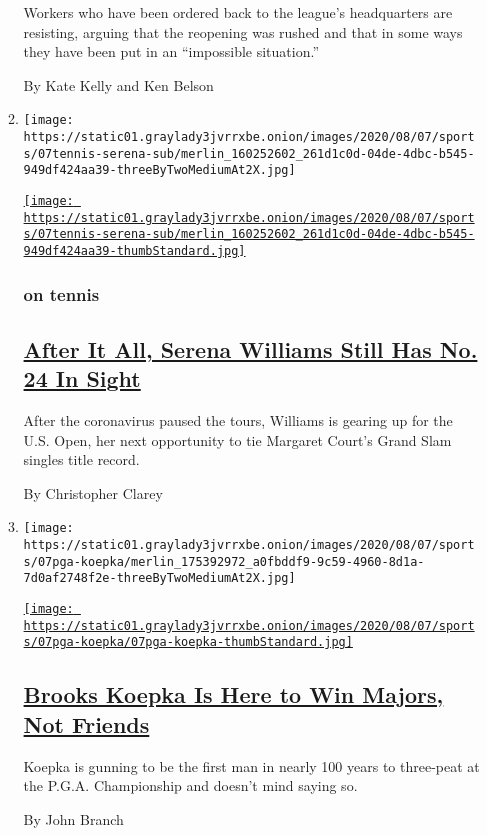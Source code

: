 \begin{enumerate}
\begin{enumerate}
    Workers who have been ordered back to the league's headquarters are
    resisting, arguing that the reopening was rushed and that in some
    ways they have been put in an ``impossible situation.''

    By Kate Kelly and Ken Belson
  \item
    \texttt{[image: https://static01.graylady3jvrrxbe.onion/images/2020/08/07/sports/07tennis-serena-sub/merlin\_160252602\_261d1c0d-04de-4dbc-b545-949df424aa39-threeByTwoMediumAt2X.jpg]}

    \href{/2020/08/07/sports/tennis/serena-williams-us-open.html}{\texttt{[image: https://static01.graylady3jvrrxbe.onion/images/2020/08/07/sports/07tennis-serena-sub/merlin\_160252602\_261d1c0d-04de-4dbc-b545-949df424aa39-thumbStandard.jpg]}}

    \hypertarget{on-tennis}{%
    \subsubsection{on tennis}\label{on-tennis}}

    \hypertarget{after-it-all-serena-williams-still-has-no-24-in-sight}{%
    \subsection{\texorpdfstring{\href{/2020/08/07/sports/tennis/serena-williams-us-open.html}{After
    It All, Serena Williams Still Has No. 24 In
    Sight}}{After It All, Serena Williams Still Has No. 24 In Sight}}\label{after-it-all-serena-williams-still-has-no-24-in-sight}}

    After the coronavirus paused the tours, Williams is gearing up for
    the U.S. Open, her next opportunity to tie Margaret Court's Grand
    Slam singles title record.

    By Christopher Clarey
  \item
    \texttt{[image: https://static01.graylady3jvrrxbe.onion/images/2020/08/07/sports/07pga-koepka/merlin\_175392972\_a0fbddf9-9c59-4960-8d1a-7d0af2748f2e-threeByTwoMediumAt2X.jpg]}

    \href{/2020/08/07/sports/brooks-koepka-pga-championship.html}{\texttt{[image: https://static01.graylady3jvrrxbe.onion/images/2020/08/07/sports/07pga-koepka/07pga-koepka-thumbStandard.jpg]}}

    \hypertarget{brooks-koepka-is-here-to-win-majors-not-friends}{%
    \subsection{\texorpdfstring{\href{/2020/08/07/sports/brooks-koepka-pga-championship.html}{Brooks
    Koepka Is Here to Win Majors, Not
    Friends}}{Brooks Koepka Is Here to Win Majors, Not Friends}}\label{brooks-koepka-is-here-to-win-majors-not-friends}}

    Koepka is gunning to be the first man in nearly 100 years to
    three-peat at the P.G.A. Championship and doesn't mind saying so.

    By John Branch
  \end{enumerate}
\end{enumerate}

